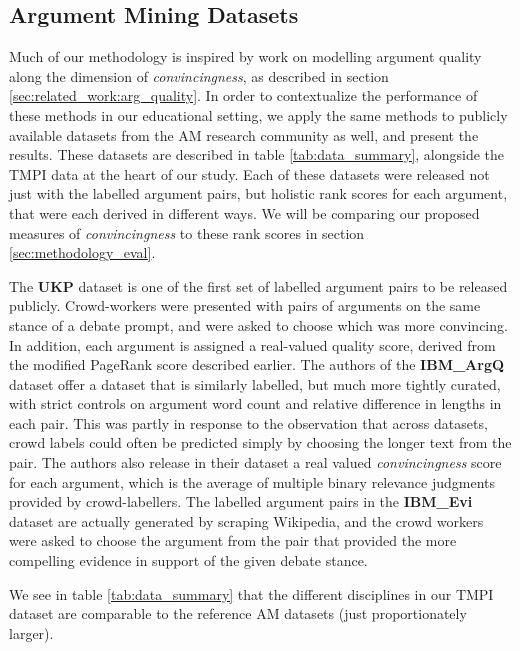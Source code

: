 \documentclass[notitlepage,12pt]{jedm}
\begin{document}
\subsection{Argument Mining Datasets}\label{sec:dataset-AM}
Much of our methodology is inspired by work on modelling argument quality along 
the dimension of \textit{convincingness}, as described in section 
\ref{sec:related_work:arg_quality}. 
In order to contextualize the performance of these methods in our educational 
setting, we apply the same methods to publicly available datasets from the 
AM research community as well, and present the results. 
These datasets are described in table \ref{tab:data_summary}, alongside the 
TMPI data at the heart of our study. 
Each of these datasets were released not just with the labelled argument pairs, 
but holistic rank scores for each argument, that were each derived in different 
ways. 
We will be comparing our proposed measures of \textit{convincingness} to these 
rank scores in section \ref{sec:methodology_eval}.

The \textbf{UKP} dataset \cite{habernal_which_2016} is one of the first set of 
labelled argument pairs to be released publicly.
Crowd-workers were presented with pairs of arguments on the same stance of a 
debate prompt, and were asked to choose which was more convincing.
In addition, each argument is assigned a real-valued quality score, derived 
from the modified PageRank score described earlier.
The authors of the \textbf{IBM\_ArgQ} dataset \cite{toledo_automatic_2019} 
offer a dataset that is similarly labelled, but much more tightly curated, with 
strict controls on argument word count and relative difference in lengths in 
each pair.
This was partly in response to the observation that across datasets, crowd 
labels could often be predicted simply by choosing the longer text from the 
pair.
The authors also release in their dataset a real valued \textit{convincingness} 
score for each argument, which is the average of multiple binary relevance 
judgments provided by crowd-labellers. 
The labelled argument pairs in the \textbf{IBM\_Evi} dataset 
\cite{gleize_are_2019} are actually generated by scraping Wikipedia, and the 
crowd workers were asked to choose the argument from the pair that provided the 
more compelling evidence in support of the given debate stance.


We see in table \ref{tab:data_summary} that the different disciplines in our 
TMPI dataset are comparable to the reference AM datasets (just proportionately 
larger).
\end{document}
